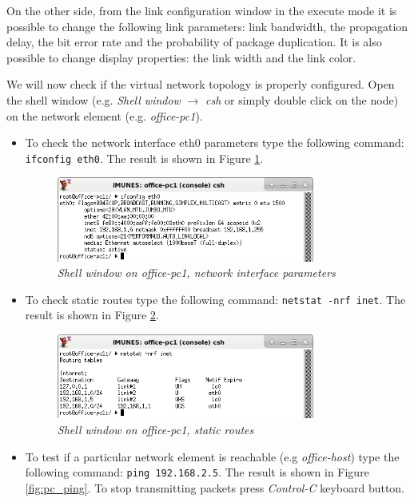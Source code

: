 On the other side, from the link configuration window in the execute mode it is
possible to change the following link parameters: link bandwidth, the
propagation delay, the bit error rate and the probability of package
duplication. It is also possible to change display properties: the link
width and the link color.

We will now check if the virtual network topology is properly configured. Open
the shell window (e.g. \emph{Shell window} $\to$ \emph{csh} or simply double
click on the node) on the network element (e.g. \emph{office-pc1}).
\begin{itemize}
\item To check the network interface eth0 parameters type the following
command: \texttt{ifconfig eth0}. The result is shown in Figure
\ref{fig:pc_ifconfig}.

\begin{figure}[H]
\centering
\vspace{10pt}
\includegraphics[width=0.8\textwidth]{./images/pc_ifconfig.png}
\caption{\emph{Shell window on office-pc1, network interface parameters}}
\label{fig:pc_ifconfig}
\end{figure}

\item To check static routes type the following command: \texttt{netstat -nrf
inet}. The result is shown in Figure \ref{fig:pc_netstat}.

\begin{figure}[H]
\centering
\vspace{10pt}
\includegraphics[width=0.8\textwidth]{./images/pc_netstat.png}
\caption{\emph{Shell window on office-pc1, static routes}}
\label{fig:pc_netstat}
\end{figure}

\item To test if a particular network element is reachable (e.g
\emph{office-host}) type the following command: \texttt{ping 192.168.2.5}. The
result is shown in Figure \ref{fig:pc_ping}. To stop transmitting packets press
\emph{Control-C} keyboard button.


\end{itemize}
